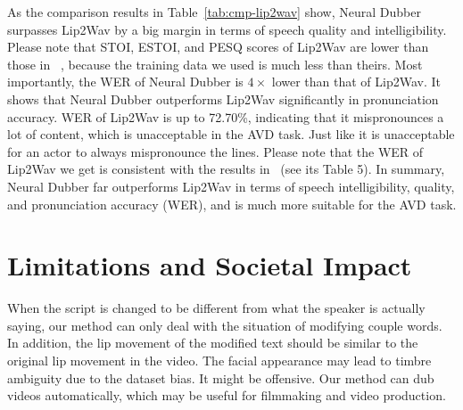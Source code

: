 \documentclass{article}
\begin{document}
As the comparison results in Table~\ref{tab:cmp-lip2wav} show, Neural Dubber surpasses Lip2Wav by a big margin in terms of speech quality and intelligibility. Please note that STOI, ESTOI, and PESQ scores of Lip2Wav are lower than those in ~\cite{prajwal2020learning}, because the training data we used is much less than theirs. Most importantly, the WER of Neural Dubber is $4\times$ lower than that of Lip2Wav. It shows that Neural Dubber outperforms Lip2Wav significantly in pronunciation accuracy. WER of Lip2Wav is up to 72.70\%, indicating that it mispronounces a lot of content, which is unacceptable in the AVD task. Just like it is unacceptable for an actor to always mispronounce the lines. Please note that the WER of Lip2Wav we get is consistent with the results in~\cite{prajwal2020learning} (see its Table 5). In summary, Neural Dubber far outperforms Lip2Wav in terms of speech intelligibility, quality, and pronunciation accuracy (WER), and is much more suitable for the AVD task.


\section{Limitations and Societal Impact}
When the script is changed to be different from what the speaker is actually saying, our method can only deal with the situation of modifying couple words. In addition, the lip movement of the modified text should be similar to the original lip movement in the video.
The facial appearance may lead to timbre ambiguity due to the dataset bias. It might be offensive. Our method can dub videos automatically, which may be useful for filmmaking and video production.
\end{document}
